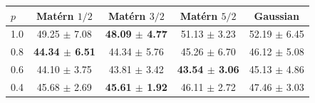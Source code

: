 \begin{tabular}{lcccc}
\toprule
$p$ & Mat\'ern $1/2$ & Mat\'ern $3/2$ & Mat\'ern $5/2$ & Gaussian \\
\midrule
1.0 & 49.25 $\pm$ 7.08 & \textbf{48.09 $\pm$ 4.77} & 51.13 $\pm$ 3.23 & 52.19 $\pm$ 6.45 \\
0.8 & \textbf{44.34 $\pm$ 6.51} & 44.34 $\pm$ 5.76 & 45.26 $\pm$ 6.70 & 46.12 $\pm$ 5.08 \\
0.6 & 44.10 $\pm$ 3.75 & 43.81 $\pm$ 3.42 & \textbf{43.54 $\pm$ 3.06} & 45.13 $\pm$ 4.86 \\
0.4 & 45.68 $\pm$ 2.69 & \textbf{45.61 $\pm$ 1.92} & 46.11 $\pm$ 2.72 & 47.46 $\pm$ 3.03 \\
\bottomrule
\end{tabular}
